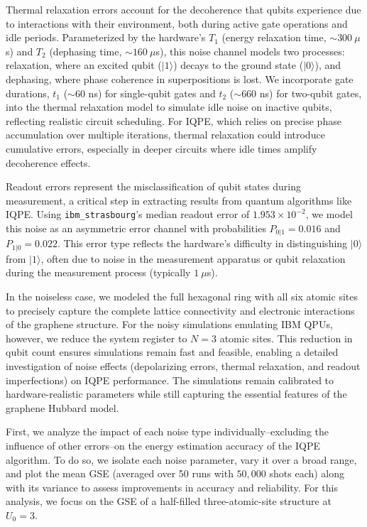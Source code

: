\documentclass[twocolumn,superscriptaddress,amsmath,amssymb,showpacs,floatfix,preprintnumbers]{revtex4-1}
\newcommand{\ibmstr}{\texttt{ibm\_strasbourg}}
\begin{document}
Thermal relaxation errors account for the decoherence that qubits experience due to interactions 
with their environment, both during active gate operations and idle periods. 
%
Parameterized by the hardware's $T_1$ (energy relaxation time, $\sim 300~\mu$s) and $T_2$ 
(dephasing time, $\sim 160~\mu$s), this noise channel models two processes: relaxation, where an excited qubit
($|1 \rangle$) decays to the ground state ($|0 \rangle$), and dephasing, where phase coherence in
superpositions is lost. 
%
We incorporate gate durations, $t_1$ ($\sim 60$ ns) for single-qubit gates and $t_2$ 
($\sim 660$ ns) for two-qubit gates, into the thermal relaxation model to simulate 
idle noise on inactive qubits, reflecting realistic circuit scheduling. 
%
For IQPE, which relies on precise phase accumulation over multiple iterations, thermal relaxation 
could introduce cumulative errors, especially in deeper circuits where idle times amplify decoherence effects.

Readout errors represent the misclassification of qubit states during measurement, a critical step in
extracting results from quantum algorithms like IQPE. 
%
Using \ibmstr's median readout error of $1.953 \times 10^{-2}$, we model this noise as an
asymmetric error channel with probabilities $P_{0|1} =  0.016$ and $P_{1|0} = 0.022$. 
%
This error type reflects the hardware's difficulty in distinguishing $|0 \rangle$ from $|1 \rangle$, 
often due to noise in the measurement apparatus or qubit relaxation during the measurement process 
(typically $1\ \mu$s). 

In the noiseless case, we modeled the full hexagonal ring with all six atomic sites to precisely
capture the complete lattice connectivity and electronic interactions of the graphene structure. 
%
For the noisy simulations emulating IBM QPUs, however, we reduce the system register to $N = 3$ 
atomic sites. 
%
This reduction in qubit count ensures simulations remain fast and feasible, enabling a detailed
investigation of noise effects (depolarizing errors, thermal relaxation, and readout imperfections) on 
IQPE performance.
%
The simulations remain calibrated to hardware-realistic parameters while still capturing the 
essential features of the graphene Hubbard model.

First, we analyze the impact of each noise type individually--excluding the influence of other errors--on 
the energy estimation accuracy of the IQPE algorithm.
%
To do so, we isolate each noise parameter, vary it over a broad range, and plot the mean GSE 
(averaged over 50 runs with $50,000$ shots each) along with its variance to assess improvements 
in accuracy and reliability.
%
For this analysis, we focus on the GSE of a half-filled three-atomic-site structure at $U_0=3$.
\end{document}

